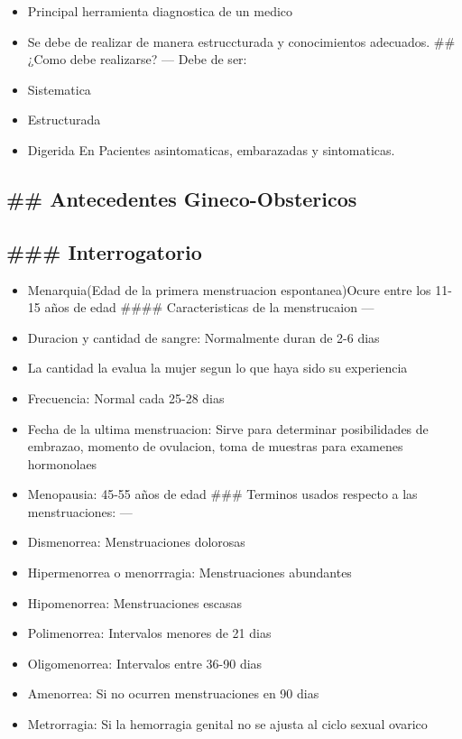 \documentclass[
]{article}
\providecommand{\tightlist}{%
  \setlength{\itemsep}{0pt}\setlength{\parskip}{0pt}}
\begin{document}
\begin{itemize}
\tightlist
\item
  Principal herramienta diagnostica de un medico
\item
  Se debe de realizar de manera estruccturada y conocimientos adecuados.
  \#\# ¿Como debe realizarse? --- Debe de ser:
\item
  Sistematica
\item
  Estructurada
\item
  Digerida En Pacientes asintomaticas, embarazadas y sintomaticas.
\end{itemize}

\hypertarget{antecedentes-gineco-obstericos}{%
\subsection{\#\# Antecedentes
Gineco-Obstericos}\label{antecedentes-gineco-obstericos}}

\hypertarget{interrogatorio}{%
\subsection{\#\#\# Interrogatorio}\label{interrogatorio}}

\begin{itemize}
\tightlist
\item
  Menarquia(Edad de la primera menstruacion espontanea)Ocure entre los
  11-15 años de edad \#\#\#\# Caracteristicas de la menstrucaion ---
\item
  Duracion y cantidad de sangre: Normalmente duran de 2-6 dias
\item
  La cantidad la evalua la mujer segun lo que haya sido su experiencia
\item
  Frecuencia: Normal cada 25-28 dias
\item
  Fecha de la ultima menstruacion: Sirve para determinar posibilidades
  de embrazao, momento de ovulacion, toma de muestras para examenes
  hormonolaes
\item
  Menopausia: 45-55 años de edad \#\#\# Terminos usados respecto a las
  menstruaciones: ---
\item
  Dismenorrea: Menstruaciones dolorosas
\item
  Hipermenorrea o menorrragia: Menstruaciones abundantes
\item
  Hipomenorrea: Menstruaciones escasas
\item
  Polimenorrea: Intervalos menores de 21 dias
\item
  Oligomenorrea: Intervalos entre 36-90 dias
\item
  Amenorrea: Si no ocurren menstruaciones en 90 dias
\item
  Metrorragia: Si la hemorragia genital no se ajusta al ciclo sexual
  ovarico
\end{itemize}
\end{document}
